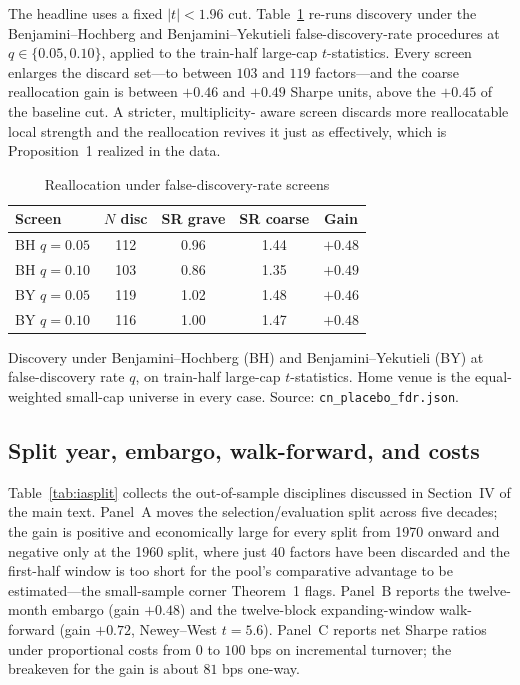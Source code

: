 \documentclass[12pt]{article}
\theoremstyle{plain}
\theoremstyle{definition}
\begin{document}
The headline uses a fixed $|t|<1.96$ cut. Table~\ref{tab:iafdr} re-runs discovery
under the Benjamini--Hochberg and Benjamini--Yekutieli false-discovery-rate
procedures at $q\in\{0.05,0.10\}$, applied to the train-half large-cap
$t$-statistics. Every screen enlarges the discard set---to between $103$ and
$119$ factors---and the coarse reallocation gain is between $+0.46$ and $+0.49$
Sharpe units, above the $+0.45$ of the baseline cut. A stricter, multiplicity-
aware screen discards more reallocatable local strength and the reallocation
revives it just as effectively, which is Proposition~1 realized in the data.

\begin{table}[t]
\centering
\caption{Reallocation under false-discovery-rate screens}
\label{tab:iafdr}
\begin{threeparttable}
\begin{tabular}{lcccc}
\toprule
Screen & $N$ disc & SR grave & SR coarse & Gain \\
\midrule
BH $q=0.05$ & 112 & 0.96 & 1.44 & $+0.48$ \\
BH $q=0.10$ & 103 & 0.86 & 1.35 & $+0.49$ \\
BY $q=0.05$ & 119 & 1.02 & 1.48 & $+0.46$ \\
BY $q=0.10$ & 116 & 1.00 & 1.47 & $+0.48$ \\
\bottomrule
\end{tabular}
\begin{tablenotes}\footnotesize
\item Discovery under Benjamini--Hochberg (BH) and Benjamini--Yekutieli (BY) at
false-discovery rate $q$, on train-half large-cap $t$-statistics. Home venue is
the equal-weighted small-cap universe in every case. Source:
\texttt{cn\_placebo\_fdr.json}.
\end{tablenotes}
\end{threeparttable}
\end{table}

\subsection{Split year, embargo, walk-forward, and costs}

Table~\ref{tab:iasplit} collects the out-of-sample disciplines discussed in
Section~IV of the main text. Panel~A moves the selection/evaluation split across
five decades; the gain is positive and economically large for every split from
1970 onward and negative only at the 1960 split, where just $40$ factors have
been discarded and the first-half window is too short for the pool's comparative
advantage to be estimated---the small-sample corner Theorem~1 flags. Panel~B
reports the twelve-month embargo (gain $+0.48$) and the twelve-block
expanding-window walk-forward (gain $+0.72$, Newey--West $t=5.6$). Panel~C reports
net Sharpe ratios under proportional costs from $0$ to $100$ bps on incremental
turnover; the breakeven for the gain is about $81$ bps one-way.
\end{document}
